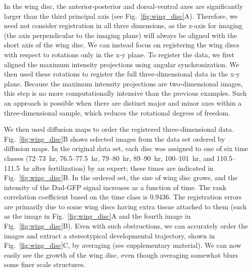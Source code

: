 \documentclass[twocolumn, 10pt]{article}
\newcommand{\SI}[0]{supplementary material}
\newcommand{\fig}[0]{Fig.}
\begin{document}
In the wing disc, the anterior-posterior and dorsal-ventral axes are significantly larger than the third principal axis (see \fig~\ref{fig:wing_disc}A). 
%
Therefore, we need not consider registration in all three dimensions, as the z-axis for imaging (the axis perpendicular to the imaging plane) will always be aligned with the short axis of the wing disc.
%
We can instead focus on registering the wing discs with respect to rotations only in the x-y plane.
%
To register the data, we first aligned the maximum intensity projections using angular synchronization.
%
We then used these rotations to register the full three-dimensional data in the x-y plane.
%
Because the maximum intensity projections are two-dimensional images, this step is no more computationally intensive than the previous examples.
%
Such an approach is possible when there are distinct major and minor axes within a three-dimensional sample, which reduces the rotational degrees of freedom.
%

We then used diffusion maps to order the registered three-dimensional data.
%
\fig~\ref{fig:wing_disc}B shows selected images from the data set ordered by diffusion maps.
%
In the original data set, each disc was assigned to one of six time classes (72--73~hr, 76.5--77.5~hr, 79--80~hr, 89--90~hr, 100--101~hr, and 110.5--111.5~hr after fertilization) by an expert; these times are indicated in \fig~\ref{fig:wing_disc}B.
%
In the ordered set, the size of wing disc grows, and the intensity of the Dad-GFP signal increases as a function of time.
%
The rank correlation coefficient based on the time class is 0.9436.
%
The registration errors are primarily due to some wing discs having extra tissue attached to them (such as the image in \fig~\ref{fig:wing_disc}A and the fourth image in \fig~\ref{fig:wing_disc}B).
%
Even with such obstructions, we can accurately order the images and extract a stereotypical developmental trajectory, shown in \fig~\ref{fig:wing_disc}C, by averaging (see \SI).
%
We can now easily see the growth of the wing disc, even though averaging somewhat blurs some finer scale structures.
%

%
%
%
\end{document}
